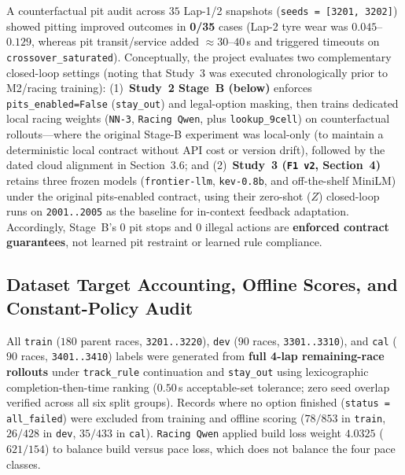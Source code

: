 \documentclass[11pt,a4paper]{article}
\begin{document}
A counterfactual pit audit across $35$ Lap-1/2 snapshots (\texttt{seeds = [3201, 3202]}) showed pitting improved outcomes in \textbf{0/35} cases (Lap-2 tyre wear was $0.045$--$0.129$, whereas pit transit/service added $\approx 30$--$40$\,s and triggered timeouts on \texttt{crossover\_saturated}). Conceptually, the project evaluates two complementary closed-loop settings (noting that Study~3 was executed chronologically prior to M2/racing training): (1)~\textbf{Study~2 Stage~B (below)} enforces \texttt{pits\_enabled=False} (\texttt{stay\_out}) and legal-option masking, then trains dedicated local racing weights (\texttt{NN-3}, \texttt{Racing Qwen}, plus \texttt{lookup\_9cell}) on counterfactual rollouts---where the original Stage-B experiment was local-only (to maintain a deterministic local contract without API cost or version drift), followed by the dated cloud alignment in Section~3.6; and (2)~\textbf{Study~3 (\texttt{F1 v2}, Section~4)} retains three frozen models (\texttt{frontier-llm}, \texttt{kev-0.8b}, and off-the-shelf MiniLM) under the original pits-enabled contract, using their zero-shot ($Z$) closed-loop runs on \texttt{2001..2005} as the baseline for in-context feedback adaptation. Accordingly, Stage~B's $0$ pit stops and $0$ illegal actions are \textbf{enforced contract guarantees}, not learned pit restraint or learned rule compliance.

\subsection{Dataset Target Accounting, Offline Scores, and Constant-Policy Audit}

All \texttt{train} ($180$ parent races, \texttt{3201..3220}), \texttt{dev} ($90$ races, \texttt{3301..3310}), and \texttt{cal} ($90$ races, \texttt{3401..3410}) labels were generated from \textbf{full 4-lap remaining-race rollouts} under \texttt{track\_rule} continuation and \texttt{stay\_out} using lexicographic completion-then-time ranking ($0.50$\,s acceptable-set tolerance; zero seed overlap verified across all six split groups). Records where no option finished (\texttt{status = all\_failed}) were excluded from training and offline scoring ($78/853$ in \texttt{train}, $26/428$ in \texttt{dev}, $35/433$ in \texttt{cal}). \texttt{Racing Qwen} applied build loss weight $4.0325$ ($621/154$) to balance build versus pace loss, which does not balance the four pace classes.
\end{document}
